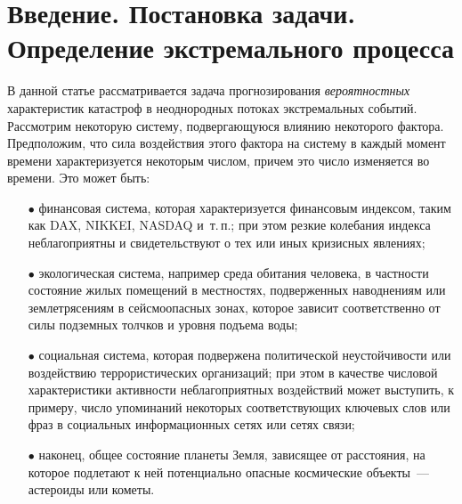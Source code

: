 \vspace*{-5pt}


\vspace*{-3pt}



      \thispagestyle{headings}

      \begin{multicols}{2}

            \label{st\stat}


\section{{Введение. Постановка задачи. Определение экстремального
процесса}}

В данной статье рассматривается задача прогнозирования \textit{вероятностных} 
характеристик катастроф в неоднородных потоках
экстремальных событий. Рассмотрим некоторую систему, подвергающуюся
влиянию некоторого фактора. Предположим, что сила воздействия этого
фактора на систему в каж\-дый момент времени характеризуется некоторым
числом, причем это число изменяется во времени. Это может быть:
\begin{itemize}
\item[$\bullet$] финансовая система, которая характеризуется финансовым
индексом, таким как DAX, NIKKEI, NASDAQ и~т.\,п.; при этом резкие
колебания индекса неблагоприятны и свидетельствуют о тех или иных
кризисных явлениях;
\item[$\bullet$] экологическая система, например среда обитания человека, в
частности состояние жилых помещений в местностях, подверженных
наводнениям или землетрясениям в сейсмоопасных зонах, которое
зависит соответственно от силы подземных толчков и уровня подъема
воды;
\item[$\bullet$] социальная система, которая подвержена по\-литической
неустойчивости или воздействию терро\-ристических организаций; при
этом в качестве числовой характеристики активности неблагоприятных
воздействий может выступить, к примеру, число упоминаний некоторых
соответствующих ключевых слов или фраз в социальных информационных
сетях или сетях \mbox{связи};
\item[$\bullet$] наконец, общее состояние планеты Земля, зависящее от
расстояния, на которое подлетают к ней потенциально опасные
космические объекты~--- астероиды или кометы.
\end{itemize}


\end{multicols}

